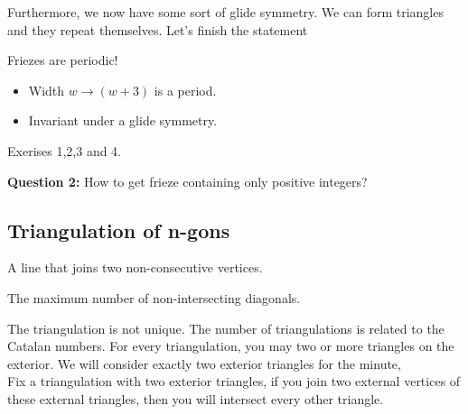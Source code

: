 \documentclass{article}
\begin{document}
Furthermore, we now have some sort of glide symmetry. We can form triangles and they repeat themselves. Let's finish the statement

\begin{nthm}[Coxeter]
  Friezes are periodic!
  \begin{itemize}
    \item Width $w \to (w+3)$ is a period.
    \item Invariant under a glide symmetry.
  \end{itemize}
\end{nthm}

\begin{ex}
  Exerises 1,2,3 and 4.
\end{ex}

\textbf{Question 2:} How to get frieze containing only positive integers?\\

\subsection{Triangulation of n-gons}

\begin{ndefi}[Diagonal]
  A line that joins two non-consecutive vertices.
\end{ndefi}

\begin{ndefi}[Triangulation]
  The maximum number of non-intersecting diagonals.
\end{ndefi}
The triangulation is not unique. The number of triangulations is related to the Catalan numbers. For every triangulation, you may two or more triangles on the exterior. We will consider exactly two exterior triangles for the minute,\\
Fix a triangulation with two exterior triangles, if you join two external vertices of these external triangles, then you will intersect every other triangle.\\
\end{document}
